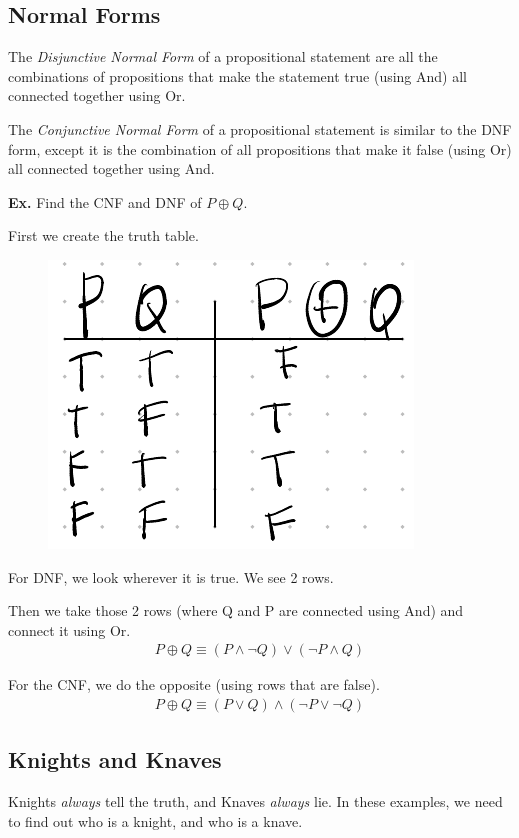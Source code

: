 \documentclass[12pt,letterpaper]{article} \usepackage{amsmath} \usepackage{graphicx}  \usepackage{longtable}  \usepackage{amssymb}
\begin{document}
        \subsection{Normal Forms}
        The \emph{Disjunctive Normal Form} of a propositional statement are all the combinations of propositions that make the statement true (using And) all connected together using Or. 
        
        The \emph{Conjunctive Normal Form} of a propositional statement is similar to the DNF form, except it is the combination of all propositions that make it false (using Or) all connected together using And. 

        \begin{mdframed}
            \textbf{Ex. } Find the CNF and DNF of $P \oplus Q$.

            First we create the truth table. 

            \begin{figure}[H]
                \centering
                \includegraphics[width=0.2\linewidth]{ex2.png}
            \end{figure}

            For DNF, we look wherever it is true. We see 2 rows. 

            Then we take those 2 rows (where Q and P are connected using And) and connect it using Or. 
            \begin{align*}
                P\oplus Q \equiv (P\land \lnot Q) \lor (\lnot P \land Q)
            \end{align*}

            For the CNF, we do the opposite (using rows that are false).
            \begin{align*}
                P\oplus Q \equiv (P\lor Q) \land (\lnot P \lor \lnot Q)
            \end{align*}
    
        \end{mdframed}

        \subsection{Knights and Knaves}
        Knights \emph{always} tell the truth, and Knaves \emph{always} lie. In these examples, we need to find out who is a knight, and who is a knave. 
\end{document}
